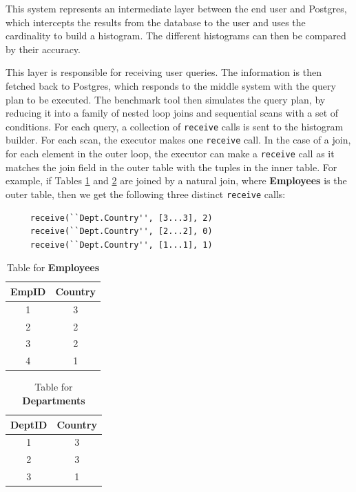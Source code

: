 \documentclass[twocolumn]{article}
\begin{document}
This system represents an intermediate layer between the end user and Postgres, which intercepts the results from the database to the user and uses the cardinality to build a histogram. The different histograms can then be compared by their accuracy.

This layer is responsible for receiving user queries. The information is then fetched back to Postgres, which responds to the middle system with the query plan to be executed. The benchmark tool then simulates the query plan, by reducing it into a family of nested loop joins and sequential scans with a set of conditions. For each query, a collection of \texttt{receive} calls is sent to the histogram builder. For each scan, the executor makes one \texttt{receive} call. In the case of a join, for each element in the outer loop, the executor can make a \texttt{receive} call as it matches the join field in the outer table with the tuples in the inner table. For example, if Tables \ref{emptable} and \ref{depttable} are joined by a natural join, where \textbf{Employees} is the outer table, then we get the following three distinct \texttt{receive} calls: 

\begin{verbatim}
	 receive(``Dept.Country'', [3...3], 2)
	 receive(``Dept.Country'', [2...2], 0) 
	 receive(``Dept.Country'', [1...1], 1) 
\end{verbatim}
	
	\begin{table}
	\begin{center}
	\begin{tabular}[t]{|c|c|}
		\hline
		\textbf{EmpID} & \textbf{Country} \\
		\hline	
			1 		& 3			 \\
			2 		& 2			 \\
			3 		& 2			 \\
			4 		& 1			 \\
		\hline
	\end{tabular}
	\end{center}
	\label{emptable}
	\caption{Table for 	\textbf{Employees}}
	\end{table}
	
	\begin{table}
	\begin{center}
	\begin{tabular}[t]{|c|c|}
		\hline
		\textbf{DeptID} & \textbf{Country} \\
		\hline	
			1 		& 3		          \\
			2 		& 3			 \\
			3 		& 1			 \\
		\hline
	\end{tabular}
	\end{center}
	\caption{Table for \textbf{Departments}}
	\label{depttable}
	\end{table}
\end{document}
